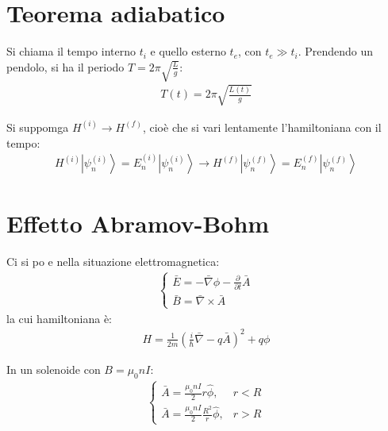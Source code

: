\section{Teorema adiabatico} %
Si chiama il tempo interno $t_i$ e quello esterno $t_e$, con $t_e\gg t_i$. Prendendo un pendolo, si ha il periodo $T =2\pi\sqrt{\frac{L}{g}}$:
\begin{equation}\begin{split}
T\left(t\right)=2\pi\sqrt{\frac{L\left(t\right)}{g}}
\end{split}\end{equation}

Si suppomga $H^{\left(i\right)}\rightarrow H^{\left(f\right)}$, cioè che si vari lentamente l'hamiltoniana con il tempo:
\begin{equation}\begin{split}
H^{\left(i\right)}\left |\psi _n^{\left(i\right)} \right\rangle=E_n^{\left(i\right)}\left |\psi _n^{\left(i\right)} \right\rangle \rightarrow H^{\left(f\right)}\left |\psi _n^{\left(f\right)} \right\rangle=E_n^{\left(f\right)}\left |\psi _n^{\left(f\right)} \right\rangle
\end{split}\end{equation}

\section{Effetto Abramov-Bohm} %
Ci si po e nella situazione elettromagnetica:
\begin{equation}\begin{split}
\begin{cases}
\bar E=-\bar \nabla \phi -\frac{\partial }{\partial t}\bar A\\
\bar B=\bar \nabla \times \bar A
\end{cases}
\end{split}\end{equation}
la cui hamiltoniana è:
\begin{equation}\begin{split}
H=\frac{1}{2m}\left(\frac{i}{\hbar }\bar \nabla -q\bar A\right)^2+q\phi
\end{split}\end{equation}

In un solenoide con $B=\mu_0nI$:
\begin{equation}\begin{split}
\begin{cases}
\bar A=\frac{\mu_0nI}{2}r\hat \phi, & r<R\\
\bar A=\frac{\mu_0nI}{2}\frac{R^2}{r}\hat\phi, & r>R
\end{cases}
\end{split}\end{equation}


